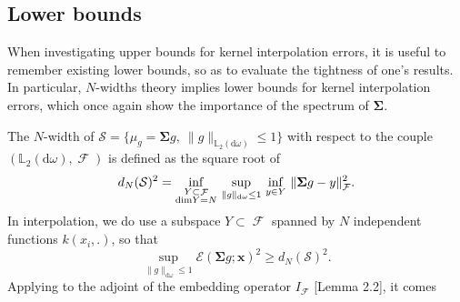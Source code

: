 \documentclass[twoside,11pt]{book}
\numberwithin{theorem}{chapter}
\numberwithin{definition}{chapter}
\numberwithin{proposition}{chapter}
\numberwithin{corollary}{chapter}
\numberwithin{example}{chapter}
\numberwithin{lemma}{chapter}
\numberwithin{assumption}{chapter}
\numberwithin{equation}{chapter}
\numberwithin{figure}{chapter}
\DeclareMathOperator{\F}{\mathcal{F}}
\def\Ltwo{\mathbb{L}_{2}(\mathrm{d} \omega)}
\newcommand{\rb}[1]{\textcolor{magenta}{#1}}
\begin{document}
\subsection{Lower bounds}\label{CVS_sec:lower_bounds}
When investigating upper bounds for kernel interpolation errors, it is useful to remember existing lower bounds, so as to evaluate the tightness of one's results. In particular, $N$-widths theory \parencite{Pin12} implies lower bounds for kernel interpolation errors, which once again show the importance of the spectrum of $\bm{\Sigma}$.

 The $N$-width of $\mathcal{S} = \{ \mu_{g} = \bm{\bm{\Sigma}}g, \: \|g\|_{\Ltwo} \leq 1\}$ with respect to the couple $(\Ltwo, \F)$ \citep[Chapter 1.7]{Pin12} is defined as the square root of
\begin{equation}
	d_{N}(\mathcal{S})^{2}  = \inf\limits_{\substack{Y \subset \F\\ \mathrm{dim}Y = N}}\, \sup\limits_{\|g\|_{\mathrm{d}\omega} \leq 1}\, \inf\limits_{y \in Y}\, \|\bm{\Sigma} g -y \|_{\F}^{2}. \nonumber \\
\end{equation}
In interpolation, we do use a subspace $Y \subset \F$ spanned by $N$ independent functions $k(x_{i},.)$, so that
\begin{equation}
\sup\limits_{\|g\|_{\mathrm{d}\omega} \leq 1} \mathcal{E}(\bm{\Sigma} g;\bm{x})^{2} \geq d_{N}(\mathcal{S})^{2}.
\end{equation}
Applying \citep[Theorem 2.2, Chapter 4]{Pin12} to the adjoint of the embedding operator $I_{\F}$ \cite{StSc12}[Lemma 2.2], it comes
%
\end{document}

